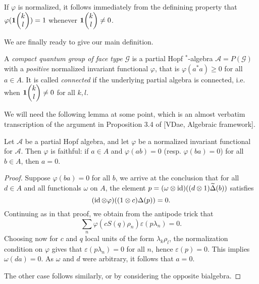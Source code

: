 \begin{Rem} If $\varphi$ is normalized, it follows immediately from the definining property that $\varphi(\mathbf{1}\!\begin{pmatrix} k \\ l\end{pmatrix})=1$ whenever $\mathbf{1}\!\begin{pmatrix} k \\ l\end{pmatrix}\neq 0$.
\end{Rem} 

We are finally ready to give our main definition.

\begin{Def} A \emph{compact quantum group of face type} $\mathscr{G}$ is a partial Hopf $^*$-algebra $\mathscr{A} = P(\mathscr{G})$ with a \emph{positive} normalized invariant functional $\varphi$, that is $\varphi(a^*a)\geq 0$ for all $a\in A$. It is called \emph{connected} if the underlying partial algebra is connected, i.e.~ when $\mathbf{1}\!\begin{pmatrix} k \\ l\end{pmatrix}\neq0$ for all $k,l$. 
\end{Def} 

We will need the following lemma at some point, which is an almost verbatim transcription of the argument in  Proposition 3.4 of [VDae, Algebraic framework].

\begin{Lem} Let $\mathscr{A}$ be a partial Hopf algebra, and let $\varphi$ be a normalized invariant functional for $\mathscr{A}$. Then $\varphi$ is faithful: if $a\in A$ and $\varphi(ab) =0$ (resp. $\varphi(ba)=0$) for all $b\in A$, then $a=0$.
\end{Lem} 
\begin{proof} Suppose  $\varphi(ba)=0$ for all $b$, we arrive at the conclusion that for all $d\in A$ and all functionals $\omega$ on $A$, the element $p = (\omega\otimes \operatorname{id})((d\otimes 1)\widetilde{\Delta}(b))$ satisfies \[(\operatorname{id}\otimes \varphi)((1\otimes c)\Delta(p)) = 0.\] Continuing as in that proof, we obtain from the antipode trick that \[\sum_n \varphi(cS(q)\rho_n)\varepsilon(p\lambda_n)=0.\] Choosing now for $c$ and $q$ local units of the form $\lambda_k\rho_l$, the normalization condition on $\varphi$ gives that $\varepsilon(p\lambda_n)=0$ for all $n$, hence $\varepsilon(p)=0$. This implies $\omega(da)=0$. As $\omega$ and $d$ were arbitrary, it follows that $a=0$.

The other case follows similarly, or by considering the opposite bialgebra.
\end{proof} 




